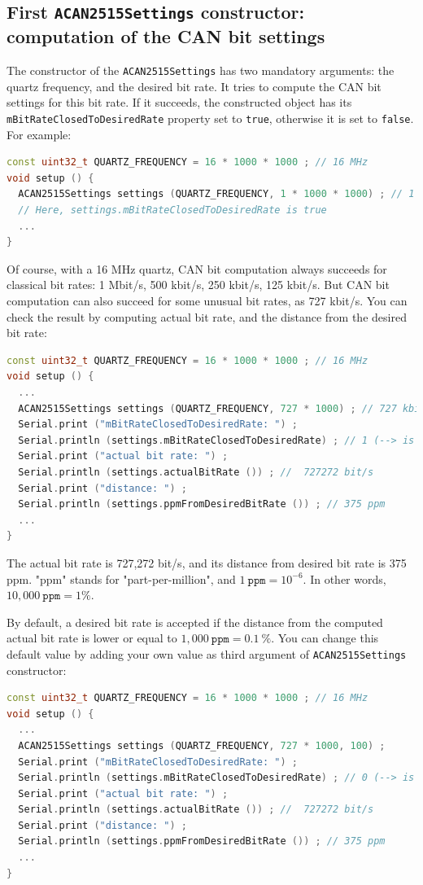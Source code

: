 \documentclass[10pt, a4paper, obeyspaces]{extarticle}
\newcommand \subsectionLabel[2]{\subsection{#1}\label{subsec:#2}}
\begin{document}
\subsectionLabel{First \texttt{ACAN2515Settings} constructor: computation of the CAN bit settings}{CANbitSettings}

The constructor of the \texttt{ACAN2515Settings} has two mandatory arguments: the quartz frequency, and the desired bit rate. It tries to compute the CAN bit settings for this bit rate. If it succeeds, the constructed object has its \texttt{mBitRateClosedToDesiredRate} property set to \texttt{true}, otherwise it is set to \texttt{false}. For example:
{ \small\begin{lstlisting}[language=c++]
const uint32_t QUARTZ_FREQUENCY = 16 * 1000 * 1000 ; // 16 MHz
void setup () {
  ACAN2515Settings settings (QUARTZ_FREQUENCY, 1 * 1000 * 1000) ; // 1 Mbit/s
  // Here, settings.mBitRateClosedToDesiredRate is true
  ...
}
\end{lstlisting}}

Of course, with a 16 MHz quartz, CAN bit computation always succeeds for classical bit rates: 1 Mbit/s, 500 kbit/s, 250 kbit/s, 125 kbit/s. But CAN bit computation can also succeed for some unusual bit rates, as 727 kbit/s. You can check the result by computing actual bit rate, and the distance from the desired bit rate:
{ \small\begin{lstlisting}[language=c++]
const uint32_t QUARTZ_FREQUENCY = 16 * 1000 * 1000 ; // 16 MHz
void setup () {
  ...
  ACAN2515Settings settings (QUARTZ_FREQUENCY, 727 * 1000) ; // 727 kbit/s
  Serial.print ("mBitRateClosedToDesiredRate: ") ;
  Serial.println (settings.mBitRateClosedToDesiredRate) ; // 1 (--> is true)
  Serial.print ("actual bit rate: ") ;
  Serial.println (settings.actualBitRate ()) ; //  727272 bit/s
  Serial.print ("distance: ") ;
  Serial.println (settings.ppmFromDesiredBitRate ()) ; // 375 ppm
  ...
}
\end{lstlisting}}

The actual bit rate is 727,272 bit/s, and its distance from desired bit rate is 375 ppm. "ppm" stands for "part-per-million", and $1~\texttt{ppm} = 10^{-6}$. In other words, $10,000~\texttt{ppm}=1\%$.


By default, a desired bit rate is accepted if the distance from the computed actual bit rate is lower or equal to $1,000~\texttt{ppm} = 0.1~\%$. You can change this default value by adding your own value as third argument of \texttt{ACAN2515Settings} constructor:
{ \small\begin{lstlisting}[language=c++]
const uint32_t QUARTZ_FREQUENCY = 16 * 1000 * 1000 ; // 16 MHz
void setup () {
  ...
  ACAN2515Settings settings (QUARTZ_FREQUENCY, 727 * 1000, 100) ;
  Serial.print ("mBitRateClosedToDesiredRate: ") ;
  Serial.println (settings.mBitRateClosedToDesiredRate) ; // 0 (--> is false)
  Serial.print ("actual bit rate: ") ;
  Serial.println (settings.actualBitRate ()) ; //  727272 bit/s
  Serial.print ("distance: ") ;
  Serial.println (settings.ppmFromDesiredBitRate ()) ; // 375 ppm
  ...
}
\end{lstlisting}}
\end{document}
